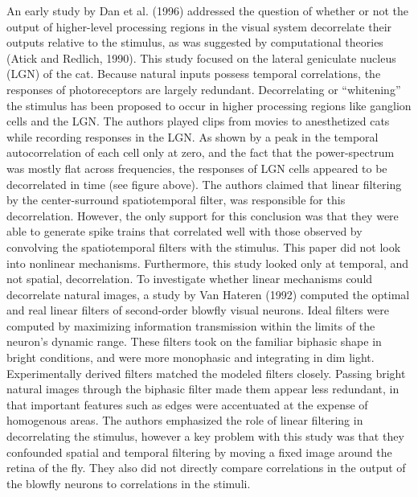 \documentclass[12pt]{article}
\begin{document}
An early study by Dan et al. (1996) addressed the question of whether or not the output of higher-level processing regions in the visual system decorrelate their outputs relative to the stimulus, as was suggested by computational theories (Atick and Redlich, 1990). This study focused on the lateral geniculate nucleus (LGN) of the cat. Because natural inputs possess temporal correlations, the responses of photoreceptors are largely redundant. Decorrelating or “whitening” the stimulus has been proposed to occur in higher processing regions like ganglion cells and the LGN. The authors played clips from movies to anesthetized cats while recording responses in the LGN. As shown by a peak in the temporal autocorrelation of each cell only at zero, and the fact that the power-spectrum was mostly flat across frequencies, the responses of LGN cells appeared to be decorrelated in time (see figure above). The authors claimed that linear filtering by the center-surround spatiotemporal filter, was responsible for this decorrelation. However, the only support for this conclusion was that they were able to generate spike trains that correlated well with those observed by convolving the spatiotemporal filters with the stimulus. This paper did not look into nonlinear mechanisms. Furthermore, this study looked only at temporal, and not spatial, decorrelation.
To investigate whether linear mechanisms could decorrelate natural images, a study by Van Hateren (1992) computed the optimal and real linear filters of second-order blowfly visual neurons. Ideal filters were computed by maximizing information transmission within the limits of the neuron’s dynamic range. These filters took on the familiar biphasic shape in bright conditions, and were more monophasic and integrating in dim light. Experimentally derived filters matched the modeled filters closely. Passing bright natural images through the biphasic filter made them appear less redundant, in that important features such as edges were accentuated at the expense of homogenous areas. The authors emphasized the role of linear filtering in decorrelating the stimulus, however a key problem with this study was that they confounded spatial and temporal filtering by moving a fixed image around the retina of the fly. They also did not directly compare correlations in the output of the blowfly neurons to correlations in the stimuli.
\end{document}

